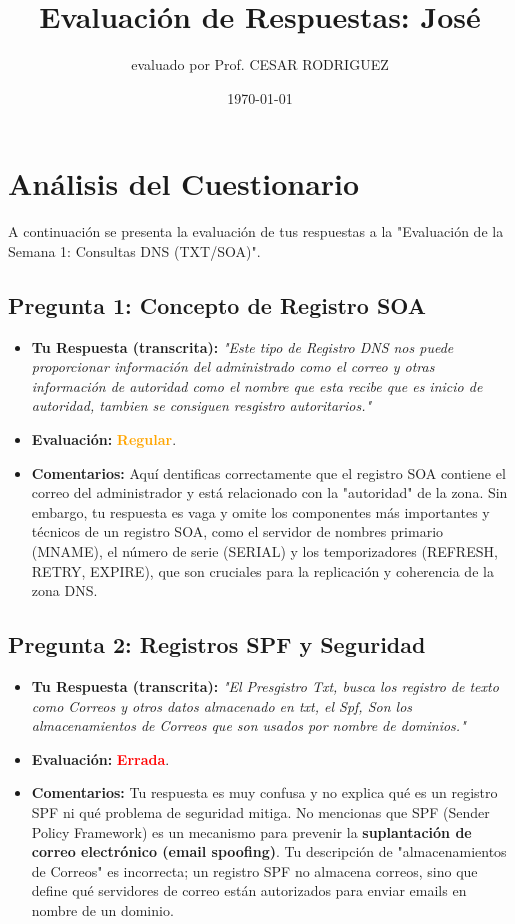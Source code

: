 \documentclass{article}
\title{Evaluación de Respuestas: José}
\author{evaluado por Prof. CESAR RODRIGUEZ}
\date{\today}
\begin{document}
\maketitle

\section*{Análisis del Cuestionario}

A continuación se presenta la evaluación de tus respuestas a la "Evaluación de la Semana 1: 
Consultas DNS (TXT/SOA)".

\subsection*{Pregunta 1: Concepto de Registro SOA}
\begin{itemize}
    \item \textbf{Tu Respuesta (transcrita):} \textit{"Este tipo de Registro DNS nos 
    puede proporcionar información del administrado como el correo y otras información de autoridad 
    como el nombre que esta recibe que es inicio de autoridad, tambien se consiguen resgistro 
    autoritarios."}
    \item \textbf{Evaluación:} \textbf{\textcolor{orange}{Regular}}.
    \item \textbf{Comentarios:} Aquí dentificas correctamente que el registro SOA contiene el 
    correo del administrador y está relacionado con la "autoridad" de la zona. Sin embargo, tu 
    respuesta es vaga y omite los componentes más importantes y técnicos de un registro SOA, como 
    el servidor de nombres primario (MNAME), el número de serie (SERIAL) y los temporizadores 
    (REFRESH, RETRY, EXPIRE), que son cruciales para la replicación y coherencia de la zona DNS.
\end{itemize}

\subsection*{Pregunta 2: Registros SPF y Seguridad}
\begin{itemize}
    \item \textbf{Tu Respuesta (transcrita):} \textit{"El Presgistro Txt, busca los registro de 
    texto como Correos y otros datos almacenado en txt, el Spf, Son los almacenamientos de Correos 
    que son usados por nombre de dominios."}
    \item \textbf{Evaluación:} \textbf{\textcolor{red}{Errada}}.
    \item \textbf{Comentarios:} Tu respuesta es muy confusa y no explica qué es un registro SPF 
    ni qué problema de seguridad mitiga. No mencionas que SPF (Sender Policy Framework) es un 
    mecanismo para prevenir la \textbf{suplantación de correo electrónico (email spoofing)}. 
    Tu descripción de "almacenamientos de Correos" es incorrecta; un registro SPF no almacena 
    correos, sino que define qué servidores de correo están autorizados para enviar emails en 
    nombre de un dominio.
\end{itemize}
\end{document}
